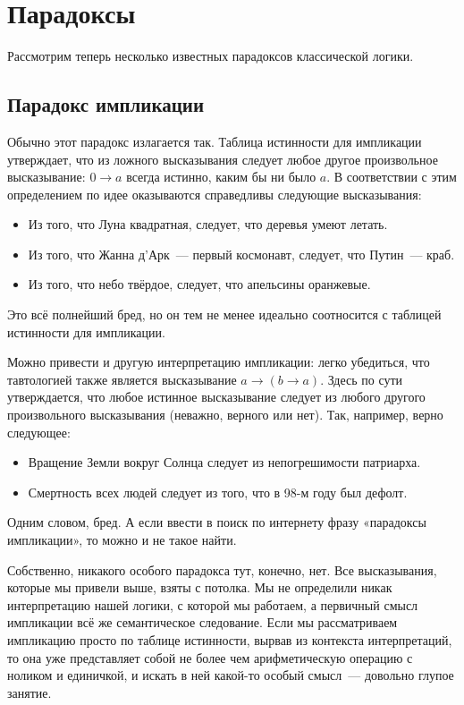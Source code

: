 \section{Парадоксы}

Рассмотрим теперь несколько известных парадоксов классической логики.

\subsection{Парадокс импликации}

Обычно этот парадокс излагается так. Таблица истинности для импликации утверждает, что из ложного высказывания следует любое другое произвольное высказывание: $0 \rightarrow a$ всегда истинно, каким бы ни было $a$. В соответствии с этим определением по идее оказываются справедливы следующие высказывания:

\begin{itemize}
\item Из того, что Луна квадратная, следует, что деревья умеют летать.
\item Из того, что Жанна д’Арк~--- первый космонавт, следует, что Путин~--- краб.
\item Из того, что небо твёрдое, следует, что апельсины оранжевые.
\end{itemize}

Это всё полнейший бред, но он тем не менее идеально соотносится с таблицей истинности для импликации.

Можно привести и другую интерпретацию импликации: легко убедиться, что тавтологией также является высказывание $a \rightarrow (b \rightarrow a)$. Здесь по сути утверждается, что любое истинное высказывание следует из любого другого произвольного высказывания (неважно, верного или нет). Так, например, верно следующее:

\begin{itemize}
\item Вращение Земли вокруг Солнца следует из непогрешимости патриарха.
\item Смертность всех людей следует из того, что в 98-м году был дефолт.
\end{itemize}

Одним словом, бред. А если ввести в поиск по интернету фразу «парадоксы импликации», то можно и не такое найти.

Собственно, никакого особого парадокса тут, конечно, нет. Все высказывания, которые мы привели выше, взяты с потолка. Мы не определили никак интерпретацию нашей логики, с которой мы работаем, а первичный смысл импликации всё же семантическое следование. Если мы рассматриваем импликацию просто по таблице истинности, вырвав из контекста интерпретаций, то она уже представляет собой не более чем арифметическую операцию с ноликом и единичкой, и искать в ней какой-то особый смысл~--- довольно глупое занятие.

